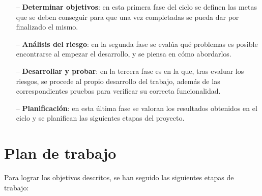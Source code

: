 \begin{itemize}
	\item[--] \textbf{Determinar objetivos}: en esta primera fase del ciclo se definen las metas que se deben conseguir para que una vez completadas se pueda dar por finalizado el mismo.
	\item[--] \textbf{Análisis del riesgo}: en la segunda fase se evalúa qué problemas es posible encontrarse al empezar el desarrollo, y se piensa en cómo abordarlos.
	\item[--] \textbf{Desarrollar y probar}: en la tercera fase es en la que, tras evaluar los riesgos, se procede al propio desarrollo del trabajo, además de las correspondientes pruebas para verificar su correcta funcionalidad.
	\item[--] \textbf{Planificación}: en esta última fase se valoran los resultados obtenidos en el ciclo y se planifican las siguientes etapas del proyecto.
\end{itemize}

\section{Plan de trabajo}
Para lograr los objetivos descritos, se han seguido las siguientes etapas de trabajo:

